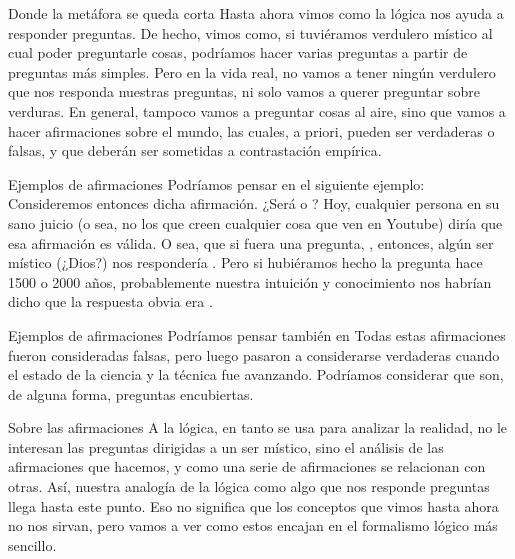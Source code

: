 
\begin{frame}{Donde la metáfora se queda corta}
  Hasta ahora vimos como la lógica nos ayuda a responder preguntas.
  \jump
  De hecho, vimos como, si tuviéramos verdulero místico al cual poder
  preguntarle cosas, podríamos hacer varias preguntas a partir de preguntas más
  simples.
  \jump
  Pero en la vida real, no vamos a tener ningún verdulero que nos responda
  nuestras preguntas, ni solo vamos a querer preguntar sobre verduras.
  \jump
  En general, tampoco vamos a preguntar cosas al aire, sino que vamos a hacer
  afirmaciones sobre el mundo, las cuales, a priori, pueden ser verdaderas o
  falsas, y que deberán ser sometidas a contrastación empírica.
\end{frame}


\begin{frame}{Ejemplos de afirmaciones}
  Podríamos pensar en el siguiente ejemplo:
  \jump
  \jump
  Consideremos entonces dicha afirmación. ¿Será \fulltrue o \fullfalse?
  \jump
  Hoy, cualquier persona en su sano juicio (o sea, no los que creen cualquier
  cosa que ven en Youtube) diría que esa afirmación es válida.
  O sea, que si fuera una pregunta, ,
  entonces, algún ser místico (¿Dios?) nos respondería \fullfalse.
  \jump
  Pero si hubiéramos hecho la pregunta hace 1500 o 2000 años, probablemente
  nuestra intuición y conocimiento nos habrían dicho que la respuesta obvia era
  \fullfalse.
\end{frame}


\begin{frame}{Ejemplos de afirmaciones}
  Podríamos pensar también en
  \jump
  \jump
  \jump
  Todas estas afirmaciones fueron consideradas falsas, pero luego pasaron a
  considerarse verdaderas cuando el estado de la ciencia y la técnica fue
  avanzando.
  \jump
  Podríamos considerar que son, de alguna forma, preguntas encubiertas.
\end{frame}


\begin{frame}{Sobre las afirmaciones}
  A la lógica, en tanto se usa para analizar la realidad, no le interesan las
  preguntas dirigidas a un ser místico, sino el análisis de las afirmaciones
  que hacemos, y como una serie de afirmaciones se relacionan con otras.
  \jump
  Así, nuestra analogía de la lógica como algo que nos responde preguntas llega
  hasta este punto.
  \jump
  Eso no significa que los conceptos que vimos hasta ahora no nos sirvan, pero
  vamos a ver como estos encajan en el formalismo lógico más sencillo.
\end{frame}

